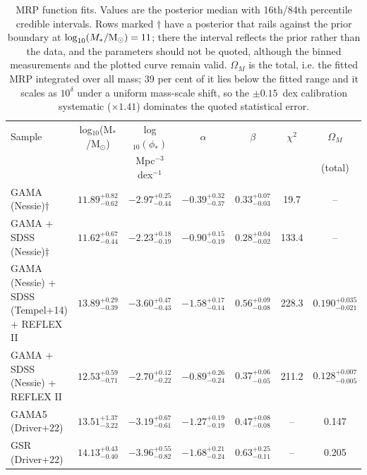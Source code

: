 \begin{table}
\centering
\caption{MRP function fits.  Values are the posterior median with 16th/84th percentile credible intervals.  Rows marked $\dagger$ have a posterior that rails against the prior boundary at $\log_{10}(M_*/{\rm M}_\odot) = 11$; there the interval reflects the prior rather than the data, and the parameters should not be quoted, although the binned measurements and the plotted curve remain valid.  $\Omega_M$ is the total, i.e. the fitted MRP integrated over all mass; 39 per cent of it lies below the fitted range and it scales as $10^{\delta}$ under a uniform mass-scale shift, so the $\pm0.15$~dex calibration systematic ($\times1.41$) dominates the quoted statistical error.}
\begin{tabular}{lcccccc}
\hline
Sample & log$_{10}$(M$_*$/M$_\odot$) & log$_{10}(\phi_*)$ & $\alpha$ & $\beta$ & $\chi^2$ & $\Omega_M$ \\
 & & Mpc$^{-3}$ dex$^{-1}$ & & & & (total) \\
\hline
GAMA (Nessie)$\dagger$ & $11.89^{+0.82}_{-0.62}$ & $-2.97^{+0.25}_{-0.44}$ & $-0.39^{+0.32}_{-0.37}$ & $0.33^{+0.07}_{-0.03}$ & 19.7 & -- \\
GAMA + SDSS (Nessie)$\dagger$ & $11.62^{+0.67}_{-0.44}$ & $-2.23^{+0.18}_{-0.19}$ & $-0.90^{+0.15}_{-0.19}$ & $0.28^{+0.04}_{-0.02}$ & 133.4 & -- \\
GAMA (Nessie) + SDSS (Tempel+14) + REFLEX II & $13.89^{+0.29}_{-0.39}$ & $-3.60^{+0.47}_{-0.43}$ & $-1.58^{+0.17}_{-0.14}$ & $0.56^{+0.09}_{-0.08}$ & 228.3 & $0.190^{+0.035}_{-0.021}$ \\
GAMA + SDSS (Nessie) + REFLEX II & $12.53^{+0.59}_{-0.71}$ & $-2.70^{+0.12}_{-0.22}$ & $-0.89^{+0.26}_{-0.24}$ & $0.37^{+0.06}_{-0.05}$ & 211.2 & $0.128^{+0.007}_{-0.005}$ \\
\hline
GAMA5 (Driver+22) & $13.51^{+1.37}_{-3.22}$ & $-3.19^{+0.67}_{-0.61}$ & $-1.27^{+0.19}_{-0.19}$ & $0.47^{+0.08}_{-0.08}$ & -- & 0.147 \\
GSR (Driver+22) & $14.13^{+0.43}_{-0.40}$ & $-3.96^{+0.55}_{-0.82}$ & $-1.68^{+0.21}_{-0.24}$ & $0.63^{+0.25}_{-0.11}$ & -- & 0.205 \\
\hline
\end{tabular}
\label{tab:mrp}
\end{table}

